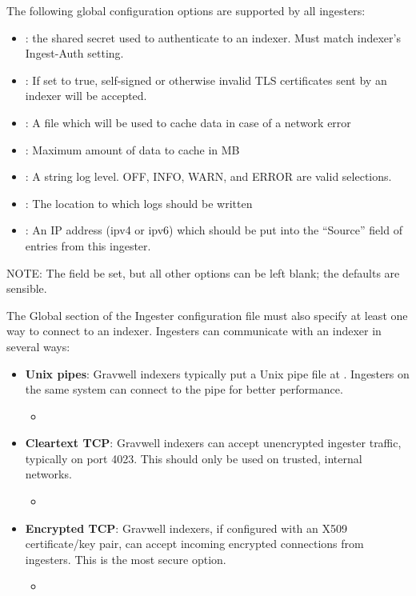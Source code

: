 The following global configuration options are supported by all
ingesters:

\begin{itemize}
\item
  : the shared secret used to authenticate to an
  indexer. Must match indexer's Ingest-Auth setting.
\item
  : If set to true, self-signed or otherwise
  invalid TLS certificates sent by an indexer will be accepted.
\item
  : A file which will be used to cache data in case
  of a network error
\item
  : Maximum amount of data to cache in MB
\item
  : A string log level. OFF, INFO, WARN, and ERROR are
  valid selections.
\item
  : The location to which logs should be written
\item
  : An IP address (ipv4 or ipv6) which should be put
  into the ``Source'' field of entries from this ingester.
\end{itemize}

NOTE: The  field  be set, but all other options
can be left blank; the defaults are sensible.

The Global section of the Ingester configuration file must also specify
at least one way to connect to an indexer. Ingesters can communicate
with an indexer in several ways:

\begin{itemize}
\item
  \textbf{Unix pipes}: Gravwell indexers typically put a Unix pipe file at
  . Ingesters on the same system can connect
  to the pipe for better performance.
	\begin{itemize}
	\item {}
	\end{itemize}
\item
  \textbf{Cleartext TCP}: Gravwell indexers can accept unencrypted ingester traffic, typically
  on port 4023. This should only be used on trusted, internal networks.
	\begin{itemize}
	\item {}
	\end{itemize}
\item
  \textbf{Encrypted TCP}: Gravwell indexers, if configured with an X509 certificate/key pair,
  can accept incoming encrypted connections from ingesters. This is the
  most secure option.
	\begin{itemize}
	\item {}
	\end{itemize}
\end{itemize}

